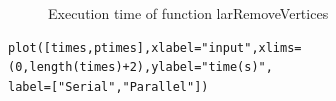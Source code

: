 \documentclass[a4paper,12pt]{article}
\begin{document}
\begin{figure}[!h]
\centering
{}
\caption{Execution time of function larRemoveVertices}
\end{figure}
\noindent {}
\begin{Verbatim}[fontsize=\footnotesize]
plot([times,ptimes],xlabel="input",xlims=(0,length(times)+2),ylabel="time(s)",
label=["Serial","Parallel"])
\end{Verbatim}
\end{document}
